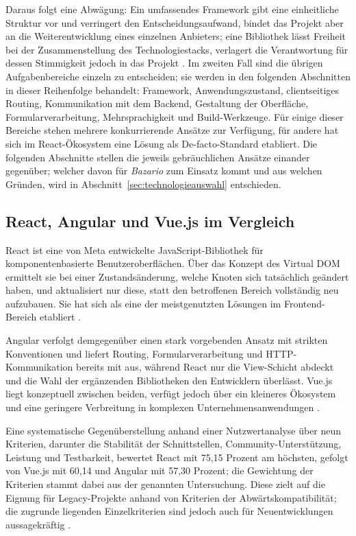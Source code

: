 Daraus folgt eine Abwägung: Ein umfassendes Framework gibt eine
einheitliche Struktur vor und verringert den Entscheidungsaufwand,
bindet das Projekt aber an die Weiterentwicklung eines einzelnen
Anbieters; eine Bibliothek lässt Freiheit bei der Zusammenstellung
des Technologiestacks, verlagert die Verantwortung für dessen
Stimmigkeit jedoch in das Projekt
\cite{repolust_frontend_frameworks}. Im zweiten Fall sind die
übrigen Aufgabenbereiche einzeln zu entscheiden; sie werden in den folgenden Abschnitten in dieser Reihenfolge
behandelt: Framework, Anwendungszustand, clientseitiges Routing,
Kommunikation mit dem Backend, Gestaltung der Oberfläche,
Formularverarbeitung, Mehrsprachigkeit und Build-Werkzeuge.
Für einige dieser Bereiche stehen mehrere konkurrierende Ansätze zur
Verfügung, für andere hat sich im React-Ökosystem eine Lösung als
De-facto-Standard etabliert. Die folgenden Abschnitte stellen die
jeweils gebräuchlichen Ansätze einander gegenüber; welcher davon für
\textit{Bazario} zum Einsatz kommt und aus welchen Gründen, wird in
Abschnitt~\ref{sec:technologieauswahl} entschieden.


\subsection{React, Angular und Vue.js im Vergleich}
\label{subsec:react}

React ist eine von Meta entwickelte JavaScript-Bibliothek für
komponentenbasierte Benutzeroberflächen. Über das Konzept des
Virtual \acs{DOM} ermittelt sie bei einer Zustandsänderung, welche
Knoten sich tatsächlich geändert haben, und aktualisiert nur diese,
statt den betroffenen Bereich vollständig neu aufzubauen. Sie hat
sich als eine der meistgenutzten Lösungen im Frontend-Bereich
etabliert \cite{comparative_spa_frameworks}.

Angular verfolgt demgegenüber einen stark vorgebenden Ansatz mit
strikten Konventionen und liefert Routing, Formularverarbeitung und
\acs{HTTP}-Kommunikation bereits mit aus, während React nur die
View-Schicht abdeckt und die Wahl der ergänzenden Bibliotheken den
Entwicklern überlässt. Vue.js liegt konzeptuell zwischen beiden,
verfügt jedoch über ein kleineres Ökosystem und eine geringere
Verbreitung in komplexen Unternehmensanwendungen
\cite{comparative_spa_frameworks}.

Eine systematische Gegenüberstellung anhand einer Nutzwertanalyse
über neun Kriterien, darunter die Stabilität der Schnittstellen,
Community-Unterstützung, Leistung und Testbarkeit, bewertet React
mit 75,15 Prozent am höchsten, gefolgt von Vue.js mit 60,14 und
Angular mit 57,30 Prozent; die Gewichtung der Kriterien stammt dabei
aus der genannten Untersuchung. Diese zielt auf die Eignung für
Legacy-Projekte anhand von Kriterien der Abwärtskompatibilität; die
zugrunde liegenden Einzelkriterien sind jedoch auch für
Neuentwicklungen aussagekräftig \cite{repolust_frontend_frameworks}.

